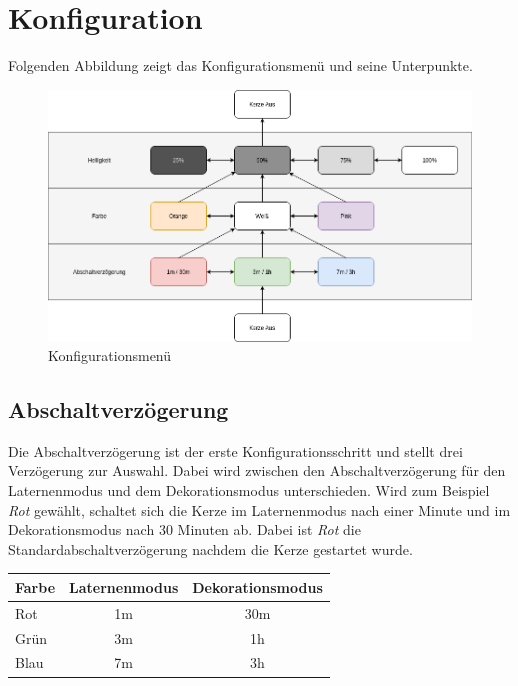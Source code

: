 \section{Konfiguration}
    \label{Konfiguration}

    Folgenden Abbildung zeigt das Konfigurationsmenü und seine Unterpunkte.
    \begin{figure}[H]
        \centering
        \includegraphics[scale=0.5]{img/Setup.png}
        \caption{Konfigurationsmenü}
    \end{figure}

    \subsection{Abschaltverzögerung}
        Die Abschaltverzögerung ist der erste Konfigurationsschritt und stellt
        drei Verzögerung zur Auswahl.
        Dabei wird zwischen den Abschaltverzögerung für den Laternenmodus und 
        dem Dekorationsmodus unterschieden. Wird zum Beispiel \textit{Rot} gewählt,
        schaltet sich die Kerze im Laternenmodus nach einer Minute und im
        Dekorationsmodus nach 30 Minuten ab. Dabei ist \textit{Rot} die
        Standardabschaltverzögerung nachdem die Kerze gestartet wurde.

        \begin{center}
            \begin{tabular}{| l | c | c |}
                \hline
                Farbe & Laternenmodus & Dekorationsmodus \\
                \hline
                Rot & 1m & 30m \\
                \hline
                Grün & 3m & 1h \\
                \hline
                Blau & 7m & 3h \\
                \hline
            \end{tabular}
        \end{center}



